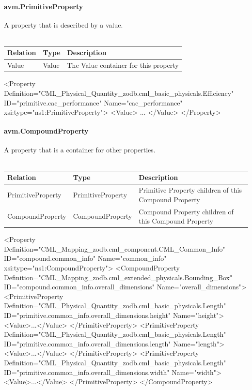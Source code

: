 \paragraph{avm.PrimitiveProperty}
A property that is described by a value.
\\ \\
\begin{tabular}{ l l p{6cm} }
\textbf{Relation} & \textbf{Type} & \textbf{Description} \\ \hline
Value & Value & The Value container for this property \\ \hline
\end{tabular}

\begin{MyVerbatim}[frame=single]
  <Property   
    Definition="CML_Physical_Quantity\cml_zodb.cml_basic_physicals.Efficiency"
   ID="primitive.cac_performance" Name="cac_performance" 
   xsi:type="ns1:PrimitiveProperty">
    <Value>
      ...
    </Value>
  </Property>
\end{MyVerbatim}

\paragraph{avm.CompoundProperty}
A property that is a container for other properties.
\\ \\
\begin{tabular}{ l l p{9cm} }
\textbf{Relation} & \textbf{Type} & \textbf{Description} \\ \hline
PrimitiveProperty & PrimitiveProperty & Primitive Property children of this Compound Property \\ \hline
CompoundProperty & CompoundProperty & Compound Property children of this Compound Property \\ \hline
\end{tabular}

\begin{MyVerbatim}[frame=single]
 <Property Definition="CML_Mapping\cml_zodb.cml_component.CML_Common_Info" 
   ID="compound.common_info" Name="common_info" 
   xsi:type="ns1:CompoundProperty">
    <CompoundProperty 
    Definition="CML_Mapping\cml_zodb.cml_extended_physicals.Bounding_Box" 
    ID="compound.common_info.overall_dimensions" 
    Name="overall_dimensions">
      <PrimitiveProperty 
        Definition="CML_Physical_Quantity\cml_zodb.cml_basic_physicals.Length" 
        ID="primitive.common_info.overall_dimensions.height" 
        Name="height">
        <Value>...</Value>
      </PrimitiveProperty>
      <PrimitiveProperty   
        Definition="CML_Physical_Quantity\cml_zodb.cml_basic_physicals.Length" 
        ID="primitive.common_info.overall_dimensions.length"
        Name="length">
        <Value>...</Value>
      </PrimitiveProperty>
      <PrimitiveProperty 
        Definition="CML_Physical_Quantity\cml_zodb.cml_basic_physicals.Length" 
        ID="primitive.common_info.overall_dimensions.width" 
        Name="width">
        <Value>...</Value>
      </PrimitiveProperty>
    </CompoundProperty>
\end{MyVerbatim}

